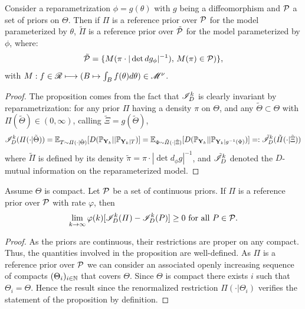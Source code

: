\begin{prop}
    Consider a reparametrization $\phi=g(\theta)$ with $g$ being a diffeomorphism and $\mathcal{P}$ a set of priors on $\Theta$.
    Then if $\varPi$ is  a reference prior over $\mathcal{P}$ for the model parameterized by $\theta$, $\tilde{\varPi}$ is a reference prior over $\tilde{\mathcal{P}}$ for the model parameterized by $\phi$, where: 
    \begin{equation}
        \tilde{\mathcal{P}} = \{ M(\pi \cdot|\det dg_\phi|^{-1}),\,M(\pi)\in\mathcal{P} ) \},
    \end{equation}
    with $M:f\in\mathscr{R}\longmapsto (B\mapsto\int_B f(\theta)d\theta)\in\mathscr{M}^\nu$. %
\end{prop}

\begin{proof}
    The proposition comes from the fact that $\mathscr{I}^k_D$ is
    clearly invariant by reparametrization: for any prior $\varPi$ having a density $\pi$ on $\Theta$, and any $\tilde\Theta\subset\Theta$ with $\varPi(\tilde\Theta)\in(0,\infty)$, calling $\tilde\Xi = g(\tilde\Theta) $,
        \begin{equation}
            \mathscr{I}^k_D(\varPi(\cdot|\tilde\Theta)) = \mathbb{E}_{T\sim\varPi(\cdot|\tilde\Theta)}[D(\mathbb{P}_{\mathbf{Y}_k}||\mathbb{P}_{\mathbf{Y}_k|T} )] = \mathbb{E}_{\Phi\sim\tilde\varPi(\cdot|\tilde\Xi)} [D(\mathbb{P}_{\mathbf{Y}_k}||\mathbb{P}_{\mathbf{Y}_k|g^{-1}(\Phi)} )] =: \tilde{\mathscr{I}}^k_D(\tilde\varPi(\cdot|\tilde\Xi))
        \end{equation}
    where $\tilde\varPi$ is defined by its density $\tilde\pi = \pi\cdot|\det d_\phi g|^{-1}$, and $\tilde{\mathscr{I}}^k_D$ denoted the $D$-mutual information on the reparameterized model.
\end{proof}

\begin{prop}
    Assume $\Theta$ is compact. Let $\mathcal{P}$ be a set of continuous priors. If $\varPi$ is a reference prior over $\mathcal{P}$ with rate $\varphi$, then
        \begin{equation}
            \lim_{k\rightarrow\infty} \varphi(k)[ \mathscr{I}_D^k(\varPi) -\mathscr{I}_D^k(P)] \geq0 \text{\ for all\ } P\in\mathcal{P}.
        \end{equation}
\end{prop}

\begin{proof}
    As the priors are continuous, their restrictions are proper on any compact. Thus, the quantities involved in the proposition are well-defined. 
    As $\varPi$ is a reference prior over $\mathcal{P}$ we can consider an associated openly increasing sequence of compacts $(\Theta_i)_{i\in\mathbb{N}}$ that covers $\Theta$. Since $\Theta$ is compact there exists $i$ such that $\Theta_i=\Theta$. Hence the result since the renormalized restriction $\varPi(\cdot|\Theta_i)$ verifies the statement of the proposition by definition.
\end{proof}

